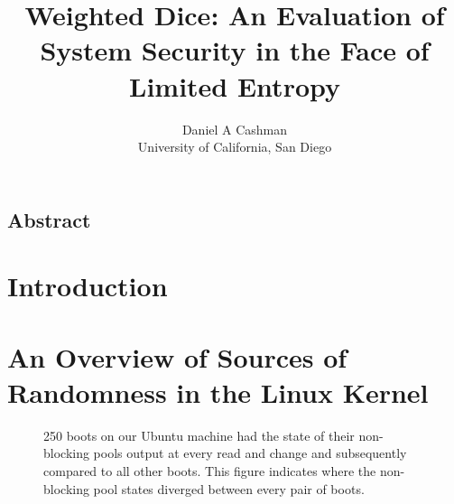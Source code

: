 

\usepackage{caption}
\usepackage{subcaption}
\usepackage{epsfig}
\usepackage{booktabs}
\usepackage{tabularx}
\usepackage{url}


\title{\Large \bf Weighted Dice: An Evaluation of System Security in the Face of Limited Entropy}

\author{
  {\rm Daniel A Cashman}\\
  University of California, San Diego
} %
\date{} %
\maketitle


\subsection*{Abstract}


\section{Introduction}


\section{An Overview of Sources of Randomness in the Linux Kernel}


\begin{figure}[htb]
        \caption{\label{fig: label} 250 boots on our Ubuntu machine had the state of their non-blocking pools output at every read and change and subsequently compared to all other boots.  This figure indicates where the non-blocking pool states diverged between every pair of boots.}
\end{figure}

